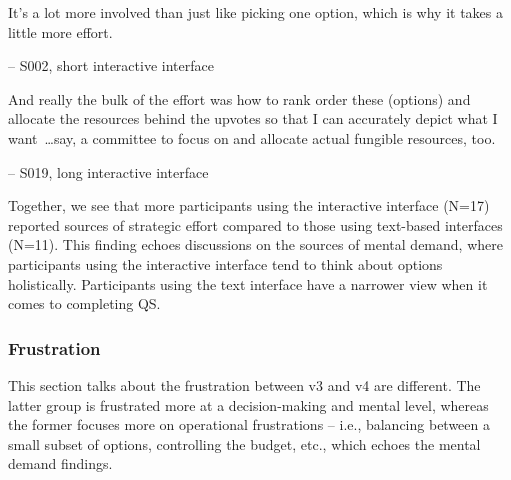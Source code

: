 \begin{displayquote}
It's a lot more involved than just like picking one option, which is why it takes a little more effort.

\noindent \hfill -- S002, short interactive interface
\end{displayquote}
    
\begin{displayquote}
And really the bulk of the effort was how to rank order these (options) and allocate the resources behind the upvotes so that I can accurately depict what I want~\ldots say, a committee to focus on and allocate actual fungible resources, too. 

\noindent \hfill -- S019, long interactive interface
\end{displayquote}

Together, we see that more participants using the interactive interface (N=17) reported sources of strategic effort compared to those using text-based interfaces (N=11). This finding echoes discussions on the sources of mental demand, where participants using the interactive interface tend to think about options holistically. Participants using the text interface have a narrower view when it comes to completing QS.
    

\subsubsection{Frustration} 
This section talks about the frustration between v3 and v4 are different. The latter group is frustrated more at a decision-making and mental level, whereas the former focuses more on operational frustrations -- i.e., balancing between a small subset of options, controlling the budget, etc., which echoes the mental demand findings.




